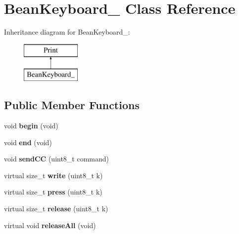 \hypertarget{class_bean_keyboard__}{}\section{Bean\+Keyboard\+\_\+ Class Reference}
\label{class_bean_keyboard__}
Inheritance diagram for Bean\+Keyboard\+\_\+\+:\begin{figure}[H]
\begin{center}
\leavevmode
\includegraphics[height=2.000000cm]{class_bean_keyboard__}
\end{center}
\end{figure}
\subsection*{Public Member Functions}
\begin{DoxyCompactItemize}
\item 
\hypertarget{class_bean_keyboard___a664cdec00e77d8f6f2105b0beb5a9a6b}{}void {\bfseries begin} (void)\label{class_bean_keyboard___a664cdec00e77d8f6f2105b0beb5a9a6b}

\item 
\hypertarget{class_bean_keyboard___ac6063d946b4410c550997eba6c5f6c99}{}void {\bfseries end} (void)\label{class_bean_keyboard___ac6063d946b4410c550997eba6c5f6c99}

\item 
\hypertarget{class_bean_keyboard___a6ced0f384c54c9523887b29e962ae75a}{}void {\bfseries send\+C\+C} (uint8\+\_\+t command)\label{class_bean_keyboard___a6ced0f384c54c9523887b29e962ae75a}

\item 
\hypertarget{class_bean_keyboard___ad0f009c98b4f34494620405f988ea8e0}{}virtual size\+\_\+t {\bfseries write} (uint8\+\_\+t k)\label{class_bean_keyboard___ad0f009c98b4f34494620405f988ea8e0}

\item 
\hypertarget{class_bean_keyboard___a79472b9329e7da829b1050d6dc331266}{}virtual size\+\_\+t {\bfseries press} (uint8\+\_\+t k)\label{class_bean_keyboard___a79472b9329e7da829b1050d6dc331266}

\item 
\hypertarget{class_bean_keyboard___ab4a09a7aa497d55d2859f79fba395ddc}{}virtual size\+\_\+t {\bfseries release} (uint8\+\_\+t k)\label{class_bean_keyboard___ab4a09a7aa497d55d2859f79fba395ddc}

\item 
\hypertarget{class_bean_keyboard___adc6a507dc3f4432313ad348c03c02c61}{}virtual void {\bfseries release\+All} (void)\label{class_bean_keyboard___adc6a507dc3f4432313ad348c03c02c61}

\end{DoxyCompactItemize}
